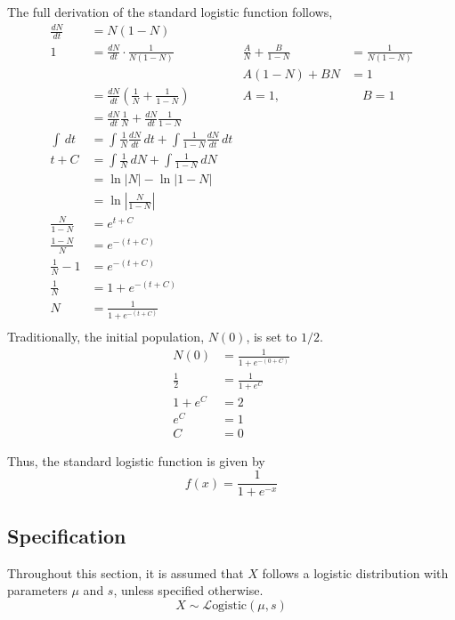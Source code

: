 \documentclass[titlepage,12 pt]{article}
\begin{document}
The full derivation of the standard logistic function follows,
\begin{align*}
    \frac{dN}{dt} & = N(1-N) \\
    1 & = \frac{dN}{dt} \cdot \frac{1}{N(1-N)} & \frac{A}{N} + \frac{B}{1-N} & = \frac{1}{N(1-N)} \\
     & & A(1-N) + BN &= 1 \\
    & = \frac{dN}{dt} \left( \frac{1}{N} + \frac{1}{1-N} \right) & A = 1,& \quad B = 1 \\[3 mm]
    & = \frac{dN}{dt} \frac{1}{N} + \frac{dN}{dt} \frac{1}{1-N} \\[3 mm]
    \int \, dt & = \int \frac{1}{N} \frac{dN}{dt} \, dt + \int \frac{1}{1-N} \frac{dN}{dt}  \, dt \\
    t + C & = \int \frac{1}{N} \, dN + \int \frac{1}{1-N} \, dN \\[3 mm]
    & = \ln|N| - \ln|1-N| \\
    & = \ln\left|\frac{N}{1-N}\right| \\
    \frac{N}{1-N} & = e^{t + C} \\[2 mm]
    \frac{1-N}{N} & = e^{-(t + C)} \\
    \frac{1}{N} - 1 & = e^{-(t + C)} \\
    \frac{1}{N} & = 1 + e^{-(t + C)} \\
    N & = \frac{1}{1 + e^{-(t + C)}} \\
\end{align*}
Traditionally, the initial population, $N(0)$, is set to $1/2$.
\begin{align*}
    N(0) & = \frac{1}{1 + e^{-(0 + C)}} \\
    \frac{1}{2} & = \frac{1}{1 + e^{C}} \\
    1 + e^{C} & = 2 \\
    e^{C} & = 1 \\
    C & = 0
\end{align*}

Thus, the standard logistic function is given by
\begin{equation} \label{log:2}
    f(x) = \frac{1}{1 + e^{-x}}
\end{equation}

\subsection{Specification}

Throughout this section, it is assumed that $X$ follows a logistic distribution with parameters $\mu$ and $s$,
unless specified otherwise.
\[
    X \sim \mathcal{L}\text{ogistic}(\mu, s)
\]
\end{document}
